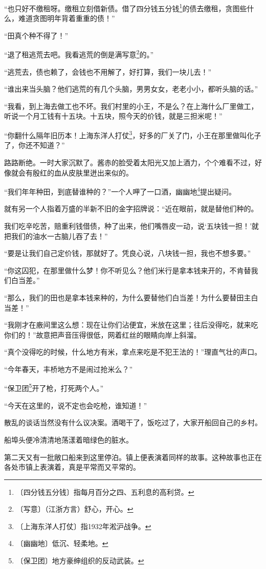 \documentclass[12pt,UTF-8,openany]{ctexbook}
\begin{document}
\begin{normalsize}
    “也只好不缴租呀。缴租立刻借新债。借了四分钱五分钱\footnote{〔四分钱五分钱〕指每月百分之四、五利息的高利贷。}的债去缴租，贪图些什么，难道贪图明年背着重重的债！” 
    
    “田真个种不得了！”
    
    “退了租逃荒去吧。我看逃荒的倒是满写意\footnote{〔写意〕（江浙方言）舒心，开心。}的。”
    
    “逃荒去，债也赖了，会钱也不用解了，好打算，我们一块儿去！”
    
    “谁出来当头脑？他们逃荒的有几个头脑，男男女女，老老小小，都听头脑的话。”
    
    “我看，到上海去做工也不坏。我们村里的小王，不是么？在上海什么厂里做工，听说一个月工钱有十五块。十五块，照今天的价钱，就是三担米呢！”
    
    “你翻什么隔年旧历本！上海东洋人打仗\footnote{〔上海东洋人打仗〕指1932年淞沪战争。}，好多的厂关了门，小王在那里做叫化子了，你还不知道？”
    
    路路断绝。一时大家沉默了。酱赤的脸受着太阳光又加上酒力，个个难看不过，好像就会有殷红的血从皮肤里迸出来似的。
    
    “我们年年种田，到底替谁种的？”一个人呷了一口酒，幽幽地\footnote{〔幽幽地〕低沉、轻柔地。}提出疑问。
    
    就有另一个人指着万盛的半新不旧的金字招牌说：“近在眼前，就是替他们种的。
    
    我们吃辛吃苦，赔重利钱借债，种了出来，他们嘴唇皮一动，说‘五块钱一担！’就把我们的油水一古脑儿吞了去！”
    
    “要是让我们自己定价钱，那就好了。凭良心说，八块钱一担，我也不想多要。”
    
    “你这囚犯，在那里做什么梦！你不听见么？他们米行是拿本钱来开的，不肯替我们白当差。”
    
    “那么，我们的田也是拿本钱来种的，为什么要替他们白当差！为什么要替田主白当差！”
    
    “我刚才在廒间里这么想：现在让你们沾便宜，米放在这里；往后没得吃，就来吃你们的！”故意把声音压得很低，网着红丝的眼睛向岸上斜溜。
    
    “真个没得吃的时候，什么地方有米，拿点来吃是不犯王法的！”理直气壮的声口。
    
    “今年春天，丰桥地方不是闹过抢米么？”
    
    “保卫团\footnote{〔保卫团〕地方豪绅组织的反动武装。}开了枪，打死两个人。”
    
    “今天在这里的，说不定也会吃枪，谁知道！”
    
    散乱的谈话当然没有什么议决案。酒喝干了，饭吃过了，大家开船回自己的乡村。
    
    船埠头便冷清清地荡漾着暗绿色的脏水。
    
    第二天又有一批敞口船来到这里停泊。镇上便表演着同样的故事。这种故事也正在各处市镇上表演着，真是平常而又平常的。
    
\end{normalsize}
\end{document}
